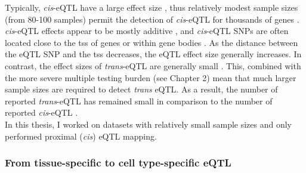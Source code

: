 Typically, \textit{cis}-eQTL have a large effect size \cite{sherman2009systematic}, thus relatively modest sample sizes (from 80-100 samples) permit the detection of \textit{cis}-eQTL for thousands of genes \cite{stranger2007population, myers2007survey}
. 
\textit{cis}-eQTL effects appear to be mostly additive \cite{powell2013congruence}, and \textit{cis}-eQTL SNPs are often located close to the \gls{tss} of genes or within gene bodies 
\cite{vosa2018unraveling}. 
As the distance between the eQTL SNP and the \gls{tss} decreases, the eQTL effect size generally increases.
In contrast, the effect sizes of \textit{trans}-eQTL are generally small \cite{cookson2009mapping, grundberg2012mapping}. 
This, combined with the more severe multiple testing burden (see Chapter 2) mean that much larger sample sizes are required to detect \textit{trans} eQTL.
As a result, the number of reported \textit{trans}-eQTL has remained small
\cite{grundberg2012mapping}
in comparison to the number of reported \textit{cis}-eQTL \cite{westra2014genome}.\\

In this thesis, I worked on datasets with relatively small sample sizes and only performed proximal (\textit{cis}) eQTL mapping.

\subsubsection{From tissue-specific to cell type-specific eQTL}
\label{sec:eqtl_celltype_specific}

